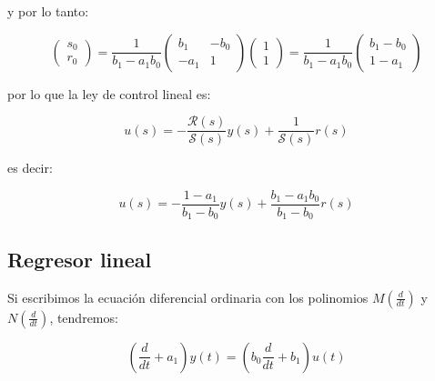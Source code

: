             y por lo tanto:

            \begin{equation*}
                \begin{pmatrix}
                    s_0 \\
                    r_0
                \end{pmatrix} = \frac{1}{b_1 - a_1 b_0}
                \begin{pmatrix}
                    b_1 & -b_0 \\
                    -a_1 & 1
                \end{pmatrix}
                \begin{pmatrix}
                    1 \\
                    1
                \end{pmatrix} = \frac{1}{b_1 - a_1 b_0}
                \begin{pmatrix}
                    b_1 - b_0 \\
                    1 - a_1
                \end{pmatrix}
            \end{equation*}

            por lo que la ley de control lineal es:

            \begin{equation*}
                u(s) = - \frac{\mathcal{R}(s)}{\mathcal{S}(s)} y(s) + \frac{1}{\mathcal{S}(s)} r(s)
            \end{equation*}

            es decir:

            \begin{equation}
                u(s) = - \frac{1 - a_1}{b_1 - b_0} y(s) + \frac{b_1 - a_1 b_0}{b_1 - b_0} r(s)
            \end{equation}


        \subsection{Regresor lineal}

            Si escribimos la ecuación diferencial ordinaria con los polinomios $M \left( \frac{d}{dt} \right)$ y $N \left( \frac{d}{dt} \right)$, tendremos:

            \begin{equation*}
                \left( \frac{d}{dt} + a_1 \right) y(t) = \left( b_0 \frac{d}{dt} + b_1 \right) u(t)
            \end{equation*}


